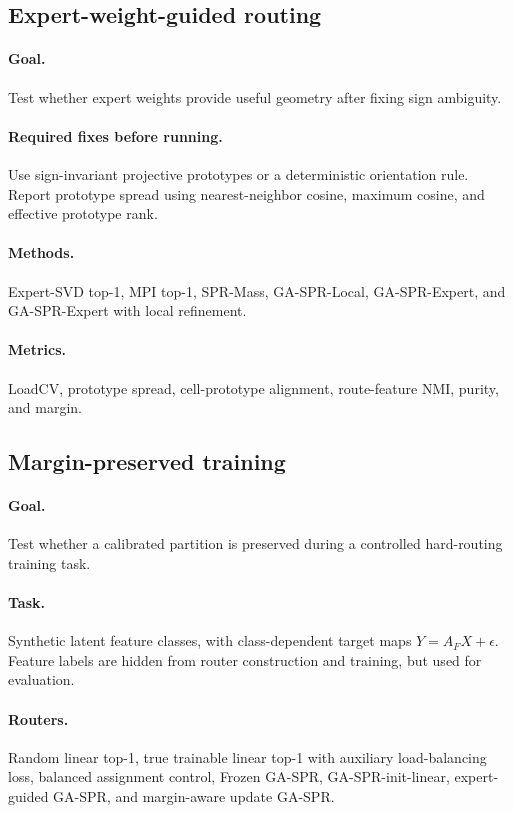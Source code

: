\documentclass{article}
\begin{document}
\subsection{Expert-weight-guided routing}

\paragraph{Goal.} Test whether expert weights provide useful geometry after
fixing sign ambiguity.

\paragraph{Required fixes before running.} Use sign-invariant projective
prototypes or a deterministic orientation rule. Report prototype spread using
nearest-neighbor cosine, maximum cosine, and effective prototype rank.

\paragraph{Methods.} Expert-SVD top-1, MPI top-1, SPR-Mass, GA-SPR-Local,
GA-SPR-Expert, and GA-SPR-Expert with local refinement.

\paragraph{Metrics.} LoadCV, prototype spread, cell-prototype alignment,
route-feature NMI, purity, and margin.

\subsection{Margin-preserved training}

\paragraph{Goal.} Test whether a calibrated partition is preserved during a
controlled hard-routing training task.

\paragraph{Task.} Synthetic latent feature classes, with class-dependent target
maps $Y=A_FX+\epsilon$.  Feature labels are hidden from router construction and
training, but used for evaluation.

\paragraph{Routers.} Random linear top-1, true trainable linear top-1 with
auxiliary load-balancing loss, balanced assignment control, Frozen GA-SPR,
GA-SPR-init-linear, expert-guided GA-SPR, and margin-aware update GA-SPR.
\end{document}
